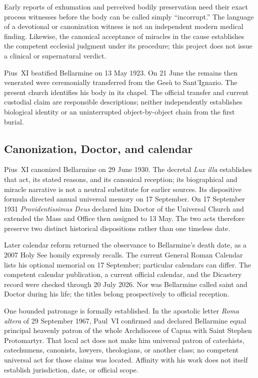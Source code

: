 Early reports of exhumation and perceived bodily preservation need their exact
process witnesses before the body can be called simply ``incorrupt.''  The
language of a devotional or canonization witness is not an independent modern
medical finding.  Likewise, the canonical acceptance of miracles in the cause
establishes the competent ecclesial judgment under its procedure; this project
does not issue a clinical or supernatural verdict.

Pius~XI beatified Bellarmine on 13 May 1923.  On 21 June the remains then
venerated were ceremonially transferred from the Gesù to Sant'Ignazio.  The
present church identifies his body in its chapel.  The official transfer and
current custodial claim are responsible descriptions; neither independently
establishes biological identity or an uninterrupted object-by-object chain
from the first burial.

\subsection{Canonization, Doctor, and calendar}

Pius~XI canonized Bellarmine on 29 June 1930.  The decretal \emph{Lux illa}
establishes that act, its stated reasons, and its canonical reception; its
biographical and miracle narrative is not a neutral substitute for earlier
sources.  Its dispositive formula directed annual universal memory on 17
September.  On 17 September 1931 \emph{Providentissimus Deus} declared him
Doctor of the Universal Church and extended the Mass and Office then assigned
to 13 May.  The two acts therefore preserve two distinct historical
dispositions rather than one timeless date.

Later calendar reform returned the observance to Bellarmine's death date, as a
2007 Holy See homily expressly recalls.  The current General Roman Calendar
lists his optional memorial on 17 September; particular calendars can differ.
The competent calendar publication, a current official calendar, and the
Dicastery record were checked through 20 July 2026.  Nor was Bellarmine called
saint and Doctor during his life; the titles belong prospectively to official
reception.

One bounded patronage is formally established.  In the apostolic letter
\emph{Roma altera} of 29 September 1967, Paul~VI confirmed and declared
Bellarmine equal principal heavenly patron of the whole Archdiocese of Capua
with Saint Stephen Protomartyr.  That local act does not make him universal
patron of catechists, catechumens, canonists, lawyers, theologians, or another
class; no competent universal act for those claims was located.  Affinity with
his work does not itself establish jurisdiction, date, or official scope.

